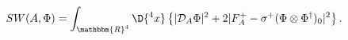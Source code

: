 \begin{equation}\label{swa1}
 SW(A,\Phi)=\int_{\mathbbm{R}^4}\D{ ^4x}\left\{
 |\mathcal{D}_A\Phi|^2+2|F^+_A-
  \sigma^+(\Phi\otimes\Phi^\dagger)_0|^2\right\}.
\end{equation}

